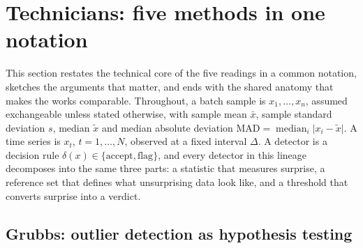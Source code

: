 \section{Technicians: five methods in one notation}
\label{sec:technicians}

This section restates the technical core of the five readings in a common
notation, sketches the arguments that matter, and ends with the shared
anatomy that makes the works comparable. Throughout, a batch sample is
$x_1,\dots,x_n$, assumed exchangeable unless stated otherwise, with sample
mean $\bar{x}$, sample standard deviation $s$, median $\tilde{x}$ and median
absolute deviation
$\mathrm{MAD} = \operatorname{median}_i \lvert x_i - \tilde{x} \rvert$. A
time series is $x_t$, $t = 1,\dots,N$, observed at a fixed interval $\Delta$.
A detector is a decision rule
$\delta(x) \in \{\text{accept}, \text{flag}\}$, and every detector in this
lineage decomposes into the same three parts: a statistic that measures
surprise, a reference set that defines what unsurprising data look like, and
a threshold that converts surprise into a verdict.

\subsection{Grubbs: outlier detection as hypothesis testing}
\label{sec:tech-grubbs}

